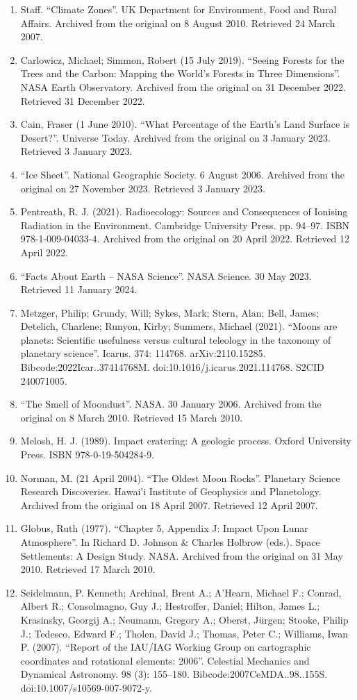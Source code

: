 \begin{enumerate}
\item Staff. ``Climate Zones''. UK Department for Environment, Food and Rural Affairs. Archived from the original on 8 August 2010. Retrieved 24 March 2007.
\item Carlowicz, Michael; Simmon, Robert (15 July 2019). ``Seeing Forests for the Trees and the Carbon: Mapping the World's Forests in Three Dimensions''. NASA Earth Observatory. Archived from the original on 31 December 2022. Retrieved 31 December 2022.
\item Cain, Fraser (1 June 2010). ``What Percentage of the Earth's Land Surface is Desert?''. Universe Today. Archived from the original on 3 January 2023. Retrieved 3 January 2023.
\item ``Ice Sheet''. National Geographic Society. 6 August 2006. Archived from the original on 27 November 2023. Retrieved 3 January 2023.
\item Pentreath, R. J. (2021). Radioecology: Sources and Consequences of Ionising Radiation in the Environment. Cambridge University Press. pp. 94–97. ISBN 978-1-009-04033-4. Archived from the original on 20 April 2022. Retrieved 12 April 2022.
\item ``Facts About Earth – NASA Science''. NASA Science. 30 May 2023. Retrieved 11 January 2024.
\item Metzger, Philip; Grundy, Will; Sykes, Mark; Stern, Alan; Bell, James; Detelich, Charlene; Runyon, Kirby; Summers, Michael (2021). ``Moons are planets: Scientific usefulness versus cultural teleology in the taxonomy of planetary science''. Icarus. 374: 114768. arXiv:2110.15285. Bibcode:2022Icar..37414768M. doi:10.1016/j.icarus.2021.114768. S2CID 240071005.
\item ``The Smell of Moondust''. NASA. 30 January 2006. Archived from the original on 8 March 2010. Retrieved 15 March 2010.
\item Melosh, H. J. (1989). Impact cratering: A geologic process. Oxford University Press. ISBN 978-0-19-504284-9.
\item Norman, M. (21 April 2004). ``The Oldest Moon Rocks''. Planetary Science Research Discoveries. Hawai'i Institute of Geophysics and Planetology. Archived from the original on 18 April 2007. Retrieved 12 April 2007.
\item Globus, Ruth (1977). ``Chapter 5, Appendix J: Impact Upon Lunar Atmosphere''. In Richard D. Johnson \& Charles Holbrow (eds.). Space Settlements: A Design Study. NASA. Archived from the original on 31 May 2010. Retrieved 17 March 2010.
\item Seidelmann, P. Kenneth; Archinal, Brent A.; A'Hearn, Michael F.; Conrad, Albert R.; Consolmagno, Guy J.; Hestroffer, Daniel; Hilton, James L.; Krasinsky, Georgij A.; Neumann, Gregory A.; Oberst, Jürgen; Stooke, Philip J.; Tedesco, Edward F.; Tholen, David J.; Thomas, Peter C.; Williams, Iwan P. (2007). ``Report of the IAU/IAG Working Group on cartographic coordinates and rotational elements: 2006''. Celestial Mechanics and Dynamical Astronomy. 98 (3): 155–180. Bibcode:2007CeMDA..98..155S. doi:10.1007/s10569-007-9072-y.

\end{enumerate}
